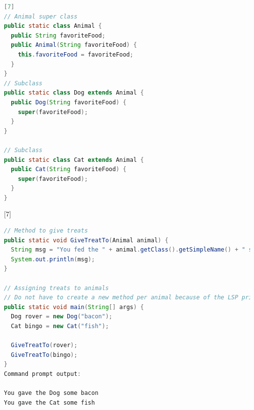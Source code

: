 \documentclass{beamer}
\begin{document}

\vspace{5mm}

\begin{lstlisting}[language=Java]
[7]
// Animal super class 
public static class Animal {
  public String favoriteFood;
  public Animal(String favoriteFood) {
    this.favoriteFood = favoriteFood;
  }
}
// Subclass
public static class Dog extends Animal {
  public Dog(String favoriteFood) {
    super(favoriteFood);
  }
}

// Subclass
public static class Cat extends Animal {
  public Cat(String favoriteFood) {
    super(favoriteFood);
  }
}
\end{lstlisting}

\vspace{5mm}



\vspace{5mm}
[7]
\begin{lstlisting}[language=Java]
// Method to give treats
public static void GiveTreatTo(Animal animal) {
  String msg = "You fed the " + animal.getClass().getSimpleName() + " some "  + animal.favoriteFood;
  System.out.println(msg);
}

// Assigning treats to animals
// Do not have to create a new method per animal because of the LSP principle
public static void main(String[] args) {
  Dog rover = new Dog("bacon");
  Cat bingo = new Cat("fish");

  GiveTreatTo(rover);
  GiveTreatTo(bingo);
}
Command prompt output:

You gave the Dog some bacon
You gave the Cat some fish
\end{lstlisting}

\end{document}
